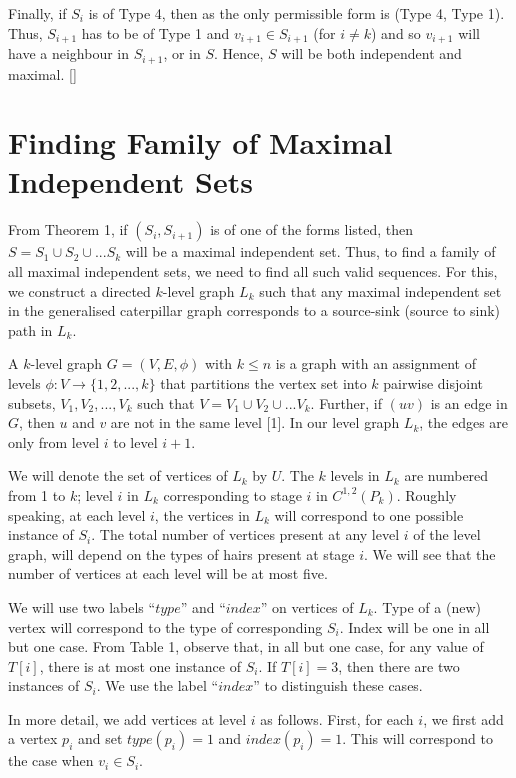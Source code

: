 \documentclass[10pt]{article}
\begin{document}
Finally, if $S_i$ is of Type 4, then as the only permissible form is
(Type 4, Type 1). Thus, $S_{i+1}$ has to be of Type 1 and $v_{i+1}\in
S_{i+1}$ (for $i\neq k$) and so $v_{i+1}$ will have a neighbour in
$S_{i+1}$, or in $S$. Hence, $S$ will be both independent and maximal. []

\section{Finding  Family of Maximal Independent Sets}

From Theorem 1, if $(S_i,S_{i+1})$ is of one of the forms listed, then
$S=S_1\cup S_2 \cup ... S_k$ will be a maximal independent set. Thus, to
find a family of all maximal independent sets, we need to find all such
valid sequences. For this, we construct a directed $k$-level graph $L_k$
such that any maximal independent set in the generalised caterpillar
graph corresponds to a source-sink (source to sink) path in $L_k$. 

A $k$-level graph $G=(V,E,\phi)$ with $k \leq n$ is a graph with an
assignment of levels $\phi:V \rightarrow \{1,2, ..., k\}$ that
partitions the vertex set into $k$ pairwise disjoint subsets, $V_1, V_2,
..., V_k$ such that $V=V_1 \cup V_2 \cup ... V_k$. Further, if $(uv)$ is
an edge in $G$, then $u$ and $v$ are not in the same level [1]. In our
level graph $L_k$, the edges are only from level $i$ to level $i+1$.

We will denote the set of vertices of $L_k$ by $U$.  The $k$ levels in
$L_k$ are numbered from 1 to $k$; level $i$ in $L_k$ corresponding to
stage $i$ in $C^{1,2}(P_k)$.  Roughly speaking, at each level $i$, the
vertices in $L_k$ will correspond to one possible instance of $S_i$.  The
total number of vertices present at any level $i$ of the level graph,
will depend on the types of hairs present at stage $i$. We will see that 
the number of vertices at each level will be at most five.

We will use two labels ``$type$'' and ``$index$'' on vertices of $L_k$.
Type of a (new) vertex will correspond to the type of corresponding
$S_i$. Index will be one in all but one case. From Table 1, observe that,
in all but one case, for any value of $T[i]$, there is at most one
instance of $S_i$. If $T[i]=3$, then there are two instances of $S_i$. We
use the label ``$index$'' to distinguish these cases.


In more detail, we add vertices at level $i$ as follows. First, for each
$i$, we first add a vertex $p_i$ and set $type(p_i)=1$ and
$index(p_i)=1$. This will correspond to the case when $v_i\in S_i$.
\end{document}
